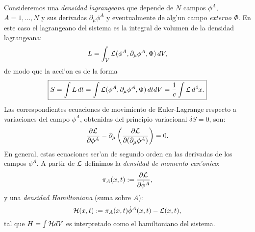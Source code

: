 Consideremos una \textit{densidad lagrangeana} que depende de $N$ campos $\phi^A$,
$A=1,\dots ,N$ y sus derivadas $\partial_\mu \phi^A$ y eventualmente de alg'un
campo {\em externo} $\Phi$. En este caso el lagrangeano del sistema es la
integral de volumen de la densidad lagrangeana:
\begin{equation}
L=\int_V {\cal L}(\phi^A,\partial_\mu\phi^A,\Phi)\, dV ,\label{lag4d}
\end{equation}
de modo que la acci'on es de la forma
\begin{equation}
\boxed{S=\int L\, dt= \int {\cal L}(\phi^A,\partial_\mu\phi^A,\Phi)\, dt dV=
\frac{1}{c}\int {\cal L}\,d^4x.}
\end{equation}
 Las correspondientes ecuaciones de movimiento de Euler-Lagrange respecto a variaciones del campo $\phi^A$, obtenidas del principio variacional $\delta S=0$, son:
\begin{equation}
\frac{\partial {\cal L}}{\partial \phi ^{A}}-\partial _{\mu }\left(
\frac{\partial {\cal L}}{\partial (\partial_{\mu }\phi^{A})}\right)=0.
\label{eccont2}
\end{equation}
En general, estas ecuaciones ser'an de segundo orden en las derivadas de los
campos $\phi^A$. A partir de $\cal L$ definimos la \textit{densidad de momento
can'onico}:
\begin{equation}
\pi_A(x,t)  := \frac{\partial{\cal L}}{\partial\dot{\phi}^A},
\label{DensidadMomentoCanonicoConjugado}
\end{equation}
 y una \textit{densidad Hamiltoniana} (suma sobre $A$):
 \begin{equation}
{\cal H}(x,t) := \pi_A(x,t) \dot{\phi}^A(x,t)-{\cal L}(x,t) ,
\label{DensidadHamiltoniana}
\end{equation}
tal que $H=\int {\cal H}dV$ es interpretado como el hamiltoniano del sistema.


